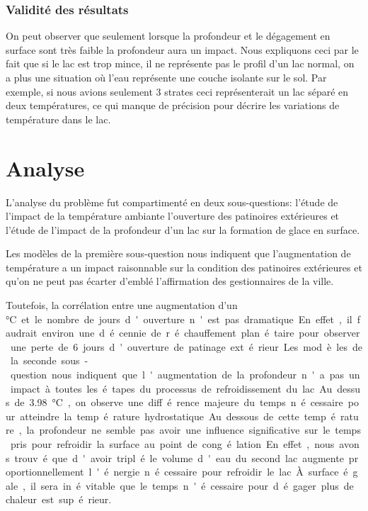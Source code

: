\documentclass[12pt]{article}
\newcommand\critical{\SI{3.98}\celsius}
\numberwithin{figure}{section}
\numberwithin{table}{section}
\begin{document}
\subsubsection{Validit\'e des r\'esultats}

On peut observer que seulement lorsque la profondeur et le d\'egagement en surface sont tr\`es
faible la profondeur aura un impact. Nous expliquons ceci par le fait que si le lac est trop mince,
il ne repr\'esente pas le profil d'un lac normal, on a plus une situation o\`u l'eau repr\'esente
une couche isolante sur le sol. Par exemple, si nous avions seulement 3 strates ceci
repr\'esenterait un lac s\'epar\'e en deux temp\'eratures, ce qui manque de pr\'ecision pour
d\'ecrire les variations de temp\'erature dans le lac.

\section{Analyse}

L'analyse du probl\`eme fut compartiment\'e en deux sous-questions: l'\'etude de l'impact de la
temp\'erature ambiante l'ouverture des patinoires ext\'erieures et l'\'etude de l'impact de la
profondeur d'un lac sur la formation de glace en surface.

Les mod\`eles de la premi\`ere sous-question nous indiquent que l'augmentation de temp\'erature a
un impact raisonnable sur la condition des patinoires ext\'erieures et qu'on ne peut pas \'ecarter
d'embl\'e l'affirmation des gestionnaires de la ville.

Toutefois, la corr\'elation entre une augmentation d'un \si\celsius et le nombre de jours
d'ouverture n'est pas dramatique. En effet, il faudrait environ une d\'ecennie de r\'echauffement
plan\'etaire pour observer une perte de 6 jours d'ouverture de patinage ext\'erieur.

Les mod\`eles de la seconde sous-question nous indiquent que l'augmentation de la profondeur n'a pas
un impact \`a toutes les \'etapes du processus de refroidissement du lac. Au dessus de \critical, on
observe une diff\'erence majeure du temps n\'ecessaire pour atteindre la temp\'erature
hydrostatique. Au dessous de cette temp\'erature, la profondeur ne semble pas avoir une influence
significative sur le temps pris pour refroidir la surface au point de cong\'elation.

En effet, nous avons trouv\'e que d'avoir tripl\'e le volume d'eau du second lac augmente
proportionnellement l'\'energie n\'ecessaire pour refroidir le lac. \`A surface \'egale, il sera
in\'evitable que le temps n'\'ecessaire pour d\'egager plus de chaleur est sup\'erieur.
\end{document}
